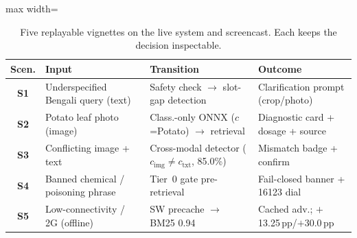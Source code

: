 \begin{table}[t]
\centering
\caption{Five replayable vignettes on the live system and screencast. Each keeps the decision inspectable.}
\label{tab:demo_scenarios}
\footnotesize
\setlength{\tabcolsep}{3pt}
\renewcommand{\arraystretch}{1.05}
\begin{adjustbox}{max width=\columnwidth}
\begin{tabular}{c p{3.0cm} p{3.8cm} p{4.5cm}}
\toprule
\textbf{Scen.} & \textbf{Input} & \textbf{Transition} & \textbf{Outcome} \\
\midrule
\textbf{S1} & Underspecified Bengali query (text) & Safety check $\rightarrow$ slot-gap detection & Clarification prompt (crop/photo) \\
\textbf{S2} & Potato leaf photo (image) & Class.-only ONNX ($c$=Potato) $\rightarrow$ retrieval & Diagnostic card + dosage + source \\
\textbf{S3} & Conflicting image + text & Cross-modal detector ($c_{\text{img}}\!\neq\!c_{\text{txt}}$, 85.0\%) & Mismatch badge + confirm \\
\textbf{S4} & Banned chemical / poisoning phrase & Tier~0 gate pre-retrieval & Fail-closed banner + 16123 dial \\
\textbf{S5} & Low-connectivity / 2G (offline) & SW precache $\rightarrow$ BM25 0.94 & Cached adv.; $+$13.25\,pp/$+$30.0\,pp \\
\bottomrule
\end{tabular}
\end{adjustbox}
\end{table}
